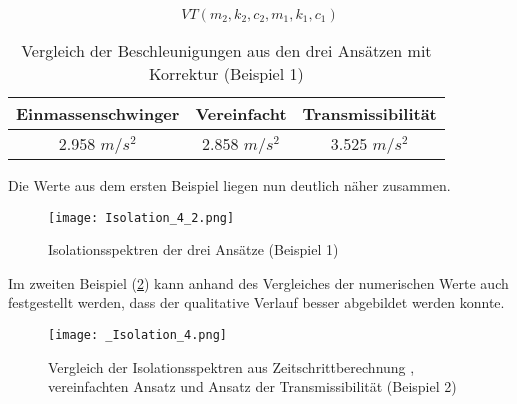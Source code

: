 \begin{equation*}
VT(m_2, k_2, c_2, m_1, k_1, c_1)
\end{equation*} 

\begin{table}[H]
\centering
\begin{tabular}{ |c|c|c| } 
 \hline
 Einmassenschwinger & Vereinfacht & Transmissibilität\\
 \hline\hline
 2.958 $m/s^2$ & 2.858 $m/s^2$ & 3.525 $m/s^2$\\
 \hline
\end{tabular}
\caption{Vergleich der Beschleunigungen aus den drei Ansätzen mit Korrektur (Beispiel 1)}
\end{table}

Die Werte aus dem ersten Beispiel liegen nun deutlich näher zusammen.

\begin{figure}[H]
    \centering
    \texttt{[image: Isolation\_4\_2.png]}
    \caption{Isolationsspektren der drei Ansätze (Beispiel 1)}
    \label{fig:Isolation2}
\end{figure}


Im zweiten Beispiel (\cref{fig:Isolation21}) kann anhand des Vergleiches der numerischen Werte auch festgestellt werden, dass der qualitative Verlauf besser abgebildet werden konnte.

\begin{figure}[H]
    \centering
    \texttt{[image: \_Isolation\_4.png]}
    \caption{Vergleich der Isolationsspektren aus Zeitschrittberechnung \cite{Isemann}, vereinfachten Ansatz und Ansatz der Transmissibilität (Beispiel 2)}
    \label{fig:Isolation21}
\end{figure}

\pagebreak